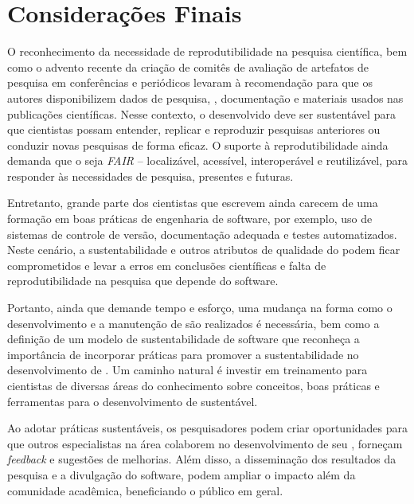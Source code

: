 \section{Considerações Finais}
\label{section:conclusions}


O reconhecimento da necessidade de reprodutibilidade na pesquisa científica, bem como o advento recente da criação de comitês de avaliação de artefatos de pesquisa em conferências e periódicos levaram à recomendação para que os autores  disponibilizem dados de pesquisa, \RS, documentação e materiais usados nas publicações científicas. 
Nesse contexto, o \RSw desenvolvido deve ser sustentável para que cientistas possam entender, replicar e reproduzir pesquisas anteriores ou conduzir novas pesquisas de forma eficaz. 
O suporte à reprodutibilidade ainda demanda que o \RSw seja \textit{FAIR} -- localizável, acessível, interoperável e reutilizável, para responder às necessidades de pesquisa, presentes e futuras. 

Entretanto, grande parte dos cientistas que escrevem \RSw ainda carecem de uma formação em boas práticas de engenharia de software, por exemplo, uso de sistemas de controle de versão, documentação adequada e testes automatizados.
Neste cenário, a sustentabilidade e outros atributos de qualidade do \RSw podem ficar comprometidos e levar a erros em conclusões científicas e falta de reprodutibilidade na pesquisa que depende do software.

Portanto, ainda que demande tempo e esforço,
uma mudança na forma como o desenvolvimento e a manutenção de \RSw são realizados é necessária, bem como a definição de um modelo de sustentabilidade de software que reconheça a importância de incorporar práticas para promover a sustentabilidade no desenvolvimento de  \RS.
Um caminho natural é investir em treinamento para cientistas de diversas áreas do conhecimento sobre conceitos, boas práticas e ferramentas
para o desenvolvimento de \RSw sustentável.

Ao adotar práticas sustentáveis, os pesquisadores podem criar oportunidades para que outros especialistas na área colaborem no desenvolvimento de seu \RS, forneçam \textit{feedback} e sugestões de melhorias. Além disso, a disseminação dos resultados da pesquisa e a divulgação do software, podem ampliar o impacto além da comunidade acadêmica, beneficiando o público em geral.

